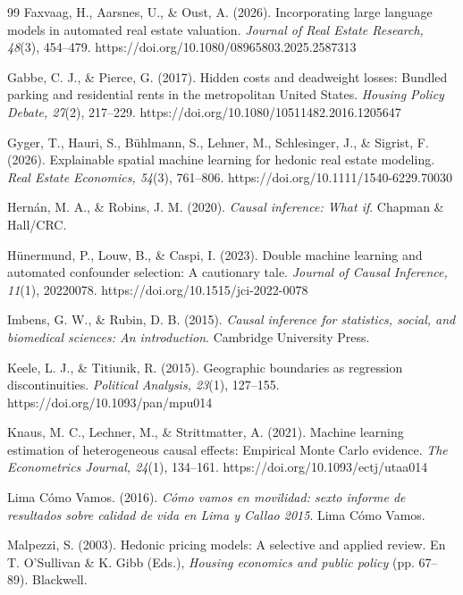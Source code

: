 \begin{thebibliography}{99}
Faxvaag, H., Aarsnes, U., \& Oust, A. (2026). Incorporating large language models in automated real estate valuation. \textit{Journal of Real Estate Research, 48}(3), 454--479. https://doi.org/10.1080/08965803.2025.2587313

Gabbe, C. J., \& Pierce, G. (2017). Hidden costs and deadweight losses: Bundled parking and residential rents in the metropolitan United States. \textit{Housing Policy Debate, 27}(2), 217--229. https://doi.org/10.1080/10511482.2016.1205647

Gyger, T., Hauri, S., Bühlmann, S., Lehner, M., Schlesinger, J., \& Sigrist, F. (2026). Explainable spatial machine learning for hedonic real estate modeling. \textit{Real Estate Economics, 54}(3), 761--806. https://doi.org/10.1111/1540-6229.70030

Hernán, M. A., \& Robins, J. M. (2020). \textit{Causal inference: What if}. Chapman \& Hall/CRC.

Hünermund, P., Louw, B., \& Caspi, I. (2023). Double machine learning and automated confounder selection: A cautionary tale. \textit{Journal of Causal Inference, 11}(1), 20220078. https://doi.org/10.1515/jci-2022-0078

Imbens, G. W., \& Rubin, D. B. (2015). \textit{Causal inference for statistics, social, and biomedical sciences: An introduction}. Cambridge University Press.

Keele, L. J., \& Titiunik, R. (2015). Geographic boundaries as regression discontinuities. \textit{Political Analysis, 23}(1), 127--155. https://doi.org/10.1093/pan/mpu014

Knaus, M. C., Lechner, M., \& Strittmatter, A. (2021). Machine learning estimation of heterogeneous causal effects: Empirical Monte Carlo evidence. \textit{The Econometrics Journal, 24}(1), 134--161. https://doi.org/10.1093/ectj/utaa014

Lima Cómo Vamos. (2016). \textit{Cómo vamos en movilidad: sexto informe de resultados sobre calidad de vida en Lima y Callao 2015}. Lima Cómo Vamos.

Malpezzi, S. (2003). Hedonic pricing models: A selective and applied review. En T. O'Sullivan \& K. Gibb (Eds.), \textit{Housing economics and public policy} (pp. 67--89). Blackwell.


\end{thebibliography}
